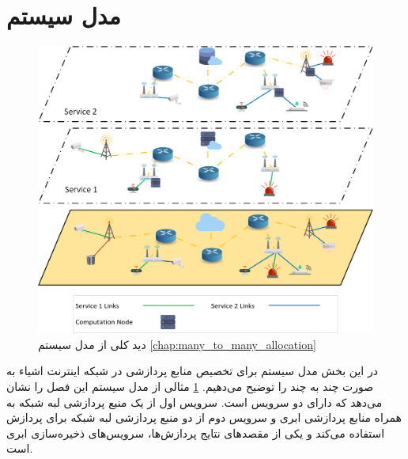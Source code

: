   \section{مدل سیستم}
    \begin{figure}[]
      \centerline{\includegraphics[width=15cm]{graphics/many_to_many/system_model}}
      \caption{دید کلی از مدل سیستم \cref{chap:many_to_many_allocation}}
      \label{fig:many_to_many:system_model}
    \end{figure}
    در این بخش مدل سیستم برای تخصیص منابع پردازشی در شبکه اینترنت اشیاء به صورت چند به چند را توضیح می‌دهیم.
    \cref{fig:many_to_many:system_model} مثالی از مدل سیستم این فصل را نشان می‌دهد که دارای دو سرویس است.
    سرویس اول از یک منبع پردازشی لبه شبکه به همراه منابع پردازشی ابری و سرویس دوم از دو منبع پردازشی لبه شبکه برای پردازش استفاده می‌کند و یکی از مقصد‌های نتایج پردازش‌ها، سرویس‌های ذخیره‌سازی ابری است.

